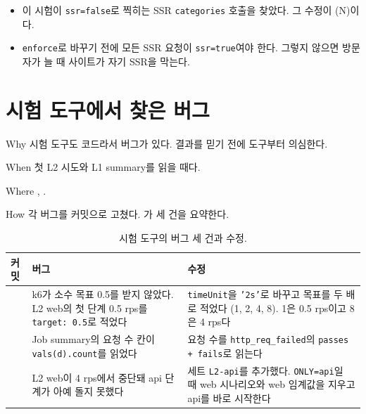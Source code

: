\begin{itemize}[nosep]
  \item 이 시험이 \texttt{ssr=false}로 찍히는 SSR \texttt{categories} 호출을 찾았다. 그 수정이 (N)이다.
  \item \texttt{enforce}로 바꾸기 전에 모든 SSR 요청이 \texttt{ssr=true}여야 한다. 그렇지 않으면 방문자가 늘 때 사이트가 자기 SSR을 막는다.
\end{itemize}

\section{시험 도구에서 찾은 버그}\label{sec:07-k6-bugs}

\begin{inbrief}
  \item[Why] 시험 도구도 코드라서 버그가 있다. 결과를 믿기 전에 도구부터 의심한다.
  \item[When] 첫 L2 시도와 L1 summary를 읽을 때다.
  \item[Where] , .
  \item[How] 각 버그를 커밋으로 고쳤다. 가 세 건을 요약한다.
\end{inbrief}

\begin{table}[H]
  \caption{시험 도구의 버그 세 건과 수정.}\label{tab:07-bugs}
  \small
  \begin{tabularx}{\linewidth}{L{2.4cm} Y Y}
    \toprule
    커밋 & 버그 & 수정 \\
    \midrule
     & k6가 소수 목표 0.5를 받지 않았다. L2 web의 첫 단계 0.5 rps를 \texttt{target: 0.5}로 적었다 & \texttt{timeUnit}을 \texttt{'2s'}로 바꾸고 목표를 두 배로 적었다 (1, 2, 4, 8). 1은 0.5 rps이고 8은 4 rps다 \\
    \midrule
     & Job summary의 요청 수 칸이 \texttt{vals(d).count}를 읽었다 & 요청 수를 \texttt{http\_req\_failed}의 \texttt{passes + fails}로 읽는다 \\
    \midrule
     & L2 web이 4 rps에서 중단돼 api 단계가 아예 돌지 못했다 & 세트 \texttt{L2-api}를 추가했다. \texttt{ONLY=api}일 때 web 시나리오와 web 임계값을 지우고 api를 바로 시작한다 \\
    \bottomrule
  \end{tabularx}
\end{table}

